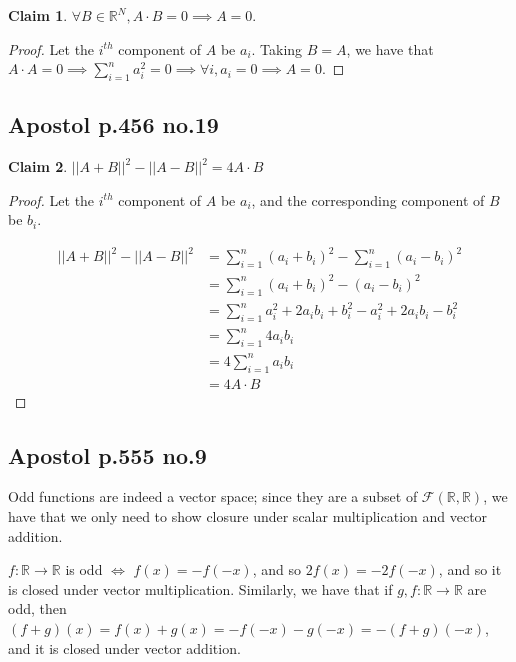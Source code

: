 \documentclass[12pt,letterpaper]{article}
\theoremstyle{definition}
\newtheorem*{claim}{Claim}
\newcommand{\R}{\mathbb{R}}
\begin{document}
\begin{claim}
  $\forall B \in \R^N, A \cdot B = 0 \implies A = 0$. 
\end{claim}

\begin{proof}
  Let the $i^{th}$ component of $A$ be $a_i$.
  Taking $B = A$, we have that $A \cdot A = 0 \implies \sum_{i=1}^na_i^2 = 0
  \implies \forall i, a_i = 0 \implies A = 0$.
\end{proof}

\subsection*{Apostol p.456 no.19}

\begin{claim}
  $||A + B||^2 - ||A - B||^2 = 4A \cdot B$
\end{claim}

\begin{proof}
  Let the $i^{th}$ component of $A$ be $a_i$, and the corresponding component of
  $B$ be $b_i$.
  
  \begin{align*}
    ||A + B||^2 - ||A - B||^2 &= \sum_{i=1}^n(a_i+b_i)^2 - \sum_{i=1}^n(a_i - b_i)^2 \\
                              &= \sum_{i=1}^n(a_i + b_i) ^2 - (a_i - b_i)^2 \\
                              &= \sum_{i=1}^n a_i^2 + 2a_ib_i + b_i^2 - a_i^2 +2a_ib_i - b_i^2 \\
                              &= \sum_{i=1}^n 4a_ib_i \\
                              &= 4\sum_{i=1}^n a_ib_i \\
                              &= 4A \cdot B
  \end{align*}
\end{proof}

\subsection*{Apostol p.555 no.9}

Odd functions are indeed a vector space; since they are a subset of
$\mathcal{F}(\R, \R)$, we have that we only need to show closure under scalar
multiplication and vector addition.

$f: \R \rightarrow \R$ is odd $\iff$ $f(x) = -f(-x)$, and so $2f(x) = -2f(-x)$,
and so it is closed under vector multiplication. Similarly, we have that if $g,
f: \R \rightarrow \R$ are odd, then $(f + g)(x) = f(x) + g(x) = -f(-x) - g(-x) =
-(f + g)(-x)$, and it is closed under vector addition. 
\end{document}
